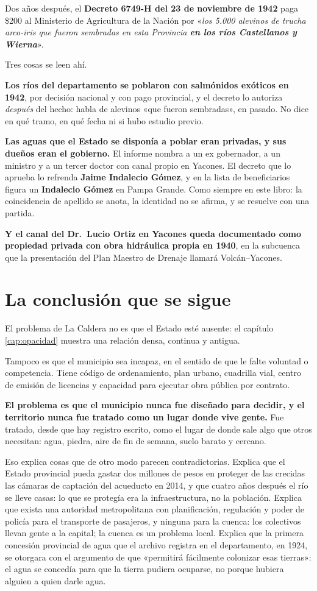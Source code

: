 Dos años después, el \textbf{Decreto 6749-H del 23 de noviembre de 1942} paga \$200 al
Ministerio de Agricultura de la Nación por «\textit{los 5.000 alevinos de trucha arco-iris que
fueron sembradas en esta Provincia \textbf{en los ríos Castellanos y Wierna}}».

Tres cosas se leen ahí.

\textbf{Los ríos del departamento se poblaron con salmónidos exóticos en 1942}, por decisión
nacional y con pago provincial, y el decreto lo autoriza \textit{después} del hecho: habla de
alevinos «que fueron sembradas», en pasado. No dice en qué tramo, en qué fecha ni si hubo
estudio previo.

\textbf{Las aguas que el Estado se disponía a poblar eran privadas, y sus dueños eran el
gobierno.} El informe nombra a un ex gobernador, a un ministro y a un tercer doctor con canal
propio en Yacones. El decreto que lo aprueba lo refrenda \textbf{Jaime Indalecio Gómez}, y en
la lista de beneficiarios figura un \textbf{Indalecio Gómez} en Pampa Grande. Como siempre en
este libro: la coincidencia de apellido se anota, la identidad no se afirma, y se resuelve con
una partida.

\textbf{Y el canal del Dr.\ Lucio Ortiz en Yacones queda documentado como propiedad privada con
obra hidráulica propia en 1940}, en la subcuenca que la presentación del Plan Maestro de Drenaje
llamará Volcán--Yacones.

\section{La conclusión que se sigue}

El problema de La Caldera no es que el Estado esté ausente: el capítulo \ref{cap:opacidad} muestra una relación densa, continua y antigua.

Tampoco es que el municipio sea incapaz, en el sentido de que le falte voluntad o
competencia. Tiene código de ordenamiento, plan urbano, cuadrilla vial, centro de emisión de
licencias y capacidad para ejecutar obra pública por contrato.

\textbf{El problema es que el municipio nunca fue diseñado para decidir, y el territorio
nunca fue tratado como un lugar donde vive gente.} Fue tratado, desde que hay registro
escrito, como el lugar de donde sale algo que otros necesitan: agua, piedra, aire de fin de
semana, suelo barato y cercano.

Eso explica cosas que de otro modo parecen contradictorias. Explica que el Estado provincial
pueda gastar dos millones de pesos en proteger de las crecidas las cámaras de captación del
acueducto en 2014, y que cuatro años después el río se lleve casas: lo que se protegía era
la infraestructura, no la población. Explica que exista una autoridad metropolitana con
planificación, regulación y poder de policía para el transporte de pasajeros, y ninguna para
la cuenca: los colectivos llevan gente a la capital; la cuenca es un problema local.
Explica que la primera concesión provincial de agua que el archivo registra en el departamento, en 1924, se otorgara con el
argumento de que «permitirá fácilmente colonizar esas tierras»: el agua se concedía para que
la tierra pudiera ocuparse, no porque hubiera alguien a quien darle agua.

